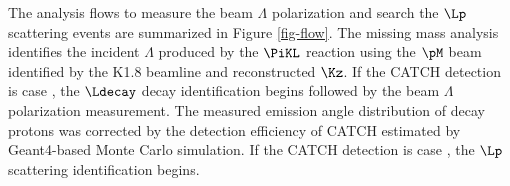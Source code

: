 
The analysis flows to measure the beam $\Lambda$ polarization and search the $\Lp$ scattering events are summarized in Figure \ref{fig-flow}. %
The missing mass analysis identifies the incident $\Lambda$ produced by the $\PiKL$ reaction using the $\pM$ beam identified by the K1.8 beamline and reconstructed $\Kz$. If the CATCH detection is case , the $\Ldecay$ decay identification begins followed by the beam $\Lambda$ polarization measurement. The measured emission angle distribution of decay protons was corrected by the detection efficiency of CATCH estimated by Geant4-based Monte Carlo simulation. If the CATCH detection is case , the $\Lp$ scattering identification begins. 

